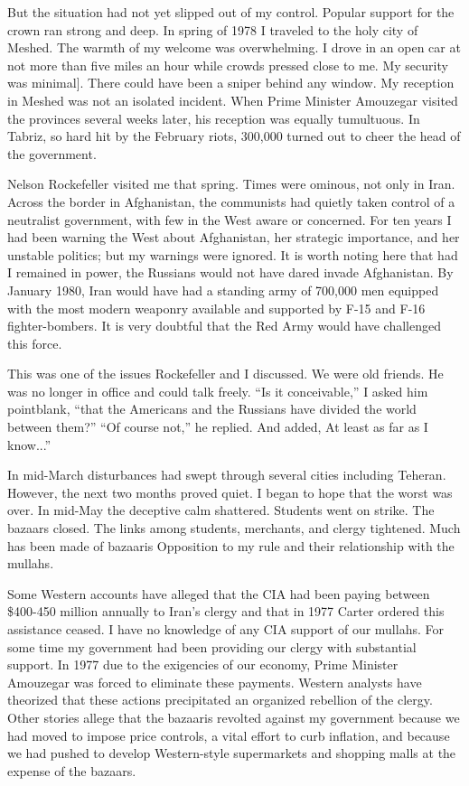 But the situation had not yet slipped out of my control. Popular support for the crown ran strong and deep. In spring of 1978 I traveled to the holy city of Meshed. The warmth of my welcome was overwhelming. I drove in an open car at not more than five miles an hour while crowds pressed close to me. My security was minimal]. There could have been a sniper behind any window. My reception in Meshed was not an isolated incident. When Prime Minister Amouzegar visited the provinces several weeks later, his reception was equally tumultuous. In Tabriz, so hard hit by the February riots, 300,000 turned out to cheer the head of the government. 

Nelson Rockefeller visited me that spring. Times were ominous, not only in Iran. Across the border in Afghanistan, the communists had quietly taken control of a neutralist government, with few in the West aware or concerned. For ten years I had been warning the West about Afghanistan, her strategic importance, and her unstable politics; but my warnings were ignored. It is worth noting here that had I remained in power, the Russians would not have dared invade Afghanistan. By January 1980, Iran would have had a standing army of 700,000 men equipped with the most modern weaponry available and supported by F-15 and F-16 fighter-bombers. It is very doubtful that the Red Army would have challenged this force. 

This was one of the issues Rockefeller and I discussed. We were old friends. He was no longer in office and could talk freely. “Is it conceivable,” I asked him pointblank, “that the Americans and the Russians have divided the world between them?” “Of course not,” he replied. And added, At least as far as I know...” 

In mid-March disturbances had swept through several cities including Teheran. However, the next two months proved quiet. I began to hope that the worst was over. In mid-May the deceptive calm shattered. Students went on strike. The bazaars closed. The links among students, merchants, and clergy tightened. Much has been made of bazaaris Opposition to my rule and their relationship with the mullahs. 

Some Western accounts have alleged that the CIA had been paying between \$400-450 million annually to Iran’s clergy and that in 1977 Carter ordered this assistance ceased. I have no knowledge of any CIA support of our mullahs. For some time my government had been providing our clergy with substantial support. In 1977 due to the exigencies of our economy, Prime Minister Amouzegar was forced to eliminate these payments. Western analysts have theorized that these actions precipitated an organized rebellion of the clergy. Other stories allege that the bazaaris revolted against my government because we had moved to impose price controls, a vital effort to curb inflation, and because we had pushed to develop Western-style supermarkets and shopping malls at the expense of the bazaars. 

